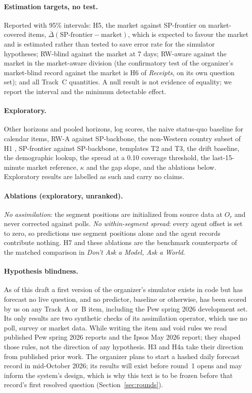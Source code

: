 \documentclass[11pt]{article}
\begin{document}
\paragraph{Estimation targets, no test.} Reported with 95\% intervals: H5, the market against SP-frontier on market-covered items, $\bar\Delta(\text{SP-frontier} - \text{market})$, which is expected to favour the market and is estimated rather than tested to save error rate for the simulator hypotheses; RW-blind against the market at 7 days; RW-aware against the market in the market-aware division (the confirmatory test of the organizer's market-blind record against the market is H6 of \emph{Receipts}, on its own question set); and all Track~C quantities. A null result is not evidence of equality; we report the interval and the minimum detectable effect.

\paragraph{Exploratory.} Other horizons and pooled horizons, log scores, the naive status-quo baseline for calendar items, RW-A against SP-backbone, the non-Western country subset of H1 \citep{durmus2023global}, SP-frontier against SP-backbone, templates T2 and T3, the drift baseline, the demographic lookup, the spread at a 0.10 coverage threshold, the last-15-minute market reference, $\kappa$ and the gap slope, and the ablations below. Exploratory results are labelled as such and carry no claims.

\paragraph{Ablations (exploratory, unranked).} \emph{No assimilation}: the segment positions are initialized from source data at $O_r$ and never corrected against polls. \emph{No within-segment spread}: every agent offset is set to zero, so predictions use segment positions alone and the agent records contribute nothing. H7 and these ablations are the benchmark counterparts of the matched comparison in \emph{Don't Ask a Model, Ask a World}.

\paragraph{Hypothesis blindness.} As of this draft a first version of the organizer's simulator exists in code but has forecast no live question, and no predictor, baseline or otherwise, has been scored by us on any Track~A or~B item, including the Pew spring 2026 development set. Its only results are two synthetic checks of its assimilation operator, which use no poll, survey or market data. While writing the item and void rules we read published Pew spring 2026 reports and the Ipsos May 2026 report; they shaped those rules, not the direction of any hypothesis. H3 and H4a take their direction from published prior work. The organizer plans to start a hashed daily forecast record in mid-October 2026; its results will exist before round~1 opens and may inform the system's design, which is why this text is to be frozen before that record's first resolved question (Section~\ref{sec:rounds}).
\end{document}
